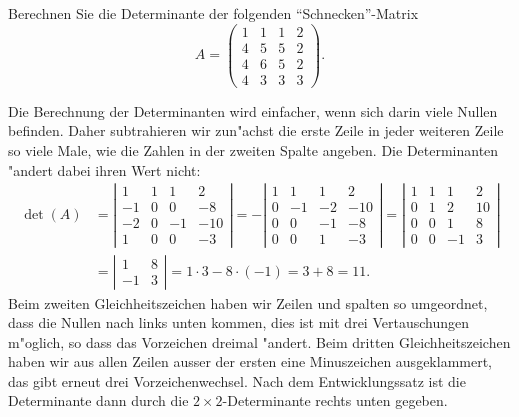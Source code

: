 Berechnen Sie die Determinante der folgenden ``Schnecken''-Matrix
\[
A=
\begin{pmatrix}
1&1&1&2\\
4&5&5&2\\
4&6&5&2\\
4&3&3&3
\end{pmatrix}.
\]

\begin{loesung}
Die Berechnung der Determinanten wird einfacher, wenn sich darin viele
Nullen befinden.
Daher subtrahieren wir zun"achst die erste Zeile in jeder weiteren Zeile
so viele Male, wie die Zahlen in der zweiten Spalte angeben.
Die Determinanten "andert dabei ihren Wert nicht:
\begin{align*}
\det(A)
&=
\left|
\begin{matrix}
1&1&1&2\\
-1&0&0&-8\\
-2&0&-1&-10\\
1&0&0&-3
\end{matrix}\right|
=
-
\left|
\begin{matrix}
1& 1& 1&  2\\
0&-1&-2&-10\\
0& 0&-1& -8\\
0& 0& 1& -3
\end{matrix}\right|
=
\left|
\begin{matrix}
1& 1& 1&  2\\
0& 1& 2& 10\\
0& 0& 1&  8\\
0& 0&-1&  3
\end{matrix}\right|
\\
&=
\left|
\begin{matrix}
1&8\\-1&3
\end{matrix}\right|
=1\cdot 3-8\cdot(-1)=3+8=11.
\end{align*}
Beim zweiten Gleichheitszeichen haben wir Zeilen und spalten so umgeordnet,
dass die Nullen nach links unten kommen, dies ist mit drei Vertauschungen
m"oglich, so dass das Vorzeichen dreimal "andert.
Beim dritten Gleichheitszeichen haben wir aus allen Zeilen ausser der ersten
eine Minuszeichen ausgeklammert, das gibt erneut drei Vorzeichenwechsel.
Nach dem Entwicklungssatz ist die Determinante dann durch die
$2\times 2$-Determinante rechts unten gegeben.


\end{loesung}
